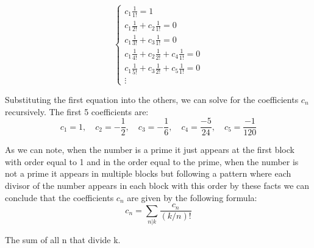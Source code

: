     \[
    \begin{cases}
    c_1 \frac{1}{1!} = 1 \\
    c_1 \frac{1}{2!} + c_2 \frac{1}{1!} = 0 \\
    c_1 \frac{1}{3!} + c_3 \frac{1}{1!} = 0 \\
    c_1 \frac{1}{4!} + c_2 \frac{1}{2!} + c_4 \frac{1}{1!} = 0 \\
    c_1 \frac{1}{5!} + c_3 \frac{1}{2!} + c_5 \frac{1}{1!} = 0 \\
    \vdots
    \end{cases}
    \]

Substituting the first equation into the others, we can solve for the coefficients $c_n$ recursively. The first 5 coefficients are:
    \[
    c_1 = 1, \quad c_2 = -\frac{1}{2}, \quad c_3 = -\frac{1}{6}, \quad c_4 = \frac{-5}{24}, \quad c_5 = \frac{-1}{120}
    \]

As we can note, when the number is a prime it just appears at the first block with order equal to 1 and in the order equal to the prime, when the number is not a prime it appears in multiple blocks but
following a pattern where each divisor of the number appears in each block with this order by these facts we can conclude that the coefficients $c_n$ are given by the following formula:
    \[
    c_n = \sum_{n|k} \frac{c_n}{(k/n)!}
    \]

The sum of all n that divide k.